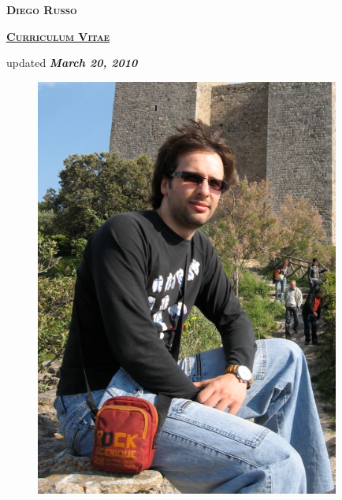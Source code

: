 \documentclass[totpages,helvetica,openbib,english]{europecv}
\begin{document}
    \begin{center}
        \hspace{1pt}
        \vspace{2cm}
    
        {\scshape \textbf{\Huge Diego Russo}}
    
        \vspace{1cm}
    
        {\scshape \textbf{\large \underline{Curriculum Vitae}}}
    
        \vspace{0.25cm}
    
        updated \emph{\textbf{March 20, 2010}}
        
        \vspace{2cm}
        
        \begin{figure}[htbp] 
            \begin{center} 
                \includegraphics[width=10cm]{io.jpg}
            \end{center} 
        \end{figure}
        
    \end{center}
\pagebreak
{}
\end{document}
